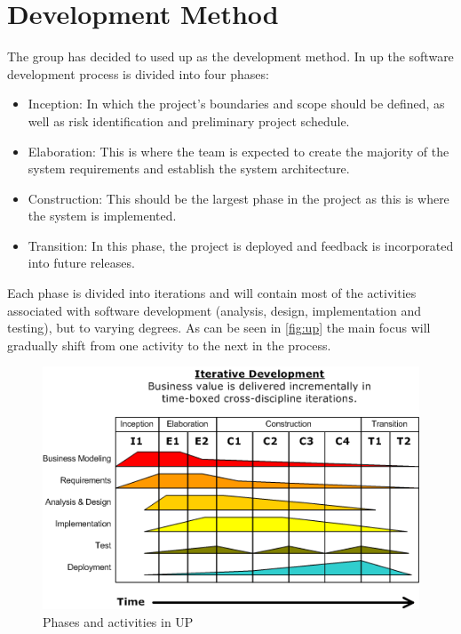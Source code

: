\section{Development Method}
The group has decided to used \ac{up} as the development method. In \ac{up} the software development process is divided into four phases: 

\begin{itemize}
\item Inception: In which the project's boundaries and scope should be defined, as well as risk identification and preliminary project schedule.
\item Elaboration: This is where the team is expected to create the majority of the system requirements and establish the system architecture.
\item Construction: This should be the largest phase in the project as this is where the system is implemented.
\item Transition: In this phase, the project is deployed and feedback is incorporated into future releases.
\end{itemize}

Each phase is divided into iterations and will contain most of the activities associated with software development (analysis, design, implementation and testing), but to varying degrees. As can be seen in \autoref{fig:up} the main focus will gradually shift from one activity to the next in the process.

\begin{figure}[hptb]
  \centering
    \includegraphics[width=\textwidth]{img/Development-iterative.gif}
  \caption{Phases and activities in UP}
  \label{fig:up}
\end{figure}

